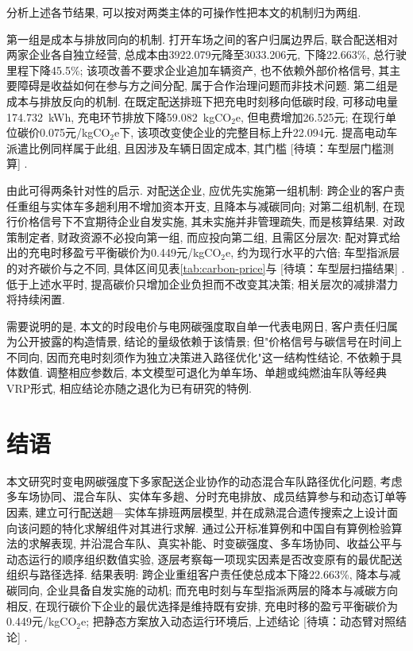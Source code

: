 \documentclass{setp-new}
\DeclareRobustCommand{\TBD}[1]{%
  \begingroup\setlength{\fboxsep}{1.2pt}%
  \colorbox{black!12}{\textcolor{black!65}{\textsf{\footnotesize[待填：#1]}}}%
  \endgroup}
\begin{document}
分析上述各节结果, 可以按对两类主体的可操作性把本文的机制归为两组.

第一组是成本与排放同向的机制. 打开车场之间的客户归属边界后, 联合配送相对两家企业各自独立经营,
总成本由3922.079元降至3033.206元, 下降22.663\%, 总行驶里程下降45.5\%;
该项改善不要求企业追加车辆资产, 也不依赖外部价格信号,
其主要障碍是收益如何在参与方之间分配, 属于合作治理问题而非技术问题.
第二组是成本与排放反向的机制. 在既定配送排班下把充电时刻移向低碳时段,
可移动电量174.732~kWh, 充电环节排放下降59.082~kgCO$_2$e, 但电费增加26.525元;
在现行单位碳价0.075元/kgCO$_2$e下, 该项改变使企业的完整目标上升22.094元.
提高电动车派遣比例同样属于此组, 且因涉及车辆日固定成本, 其门槛\TBD{车型层门槛测算}.

由此可得两条针对性的启示. 对配送企业, 应优先实施第一组机制:
跨企业的客户责任重组与实体车多趟利用不增加资本开支, 且降本与减碳同向;
对第二组机制, 在现行价格信号下不宜期待企业自发实施, 其未实施并非管理疏失, 而是核算结果.
对政策制定者, 财政资源不必投向第一组, 而应投向第二组, 且需区分层次:
配对算式给出的充电时移盈亏平衡碳价为0.449元/kgCO$_2$e, 约为现行水平的六倍;
车型指派层的对齐碳价与之不同, 具体区间见表\ref{tab:carbon-price}与\TBD{车型层扫描结果}.
低于上述水平时, 提高碳价只增加企业负担而不改变其决策; 相关层次的减排潜力将持续闲置.

需要说明的是, 本文的时段电价与电网碳强度取自单一代表电网日,
客户责任归属为公开披露的构造情景, 结论的量级依赖于该情景;
但"价格信号与碳信号在时间上不同向, 因而充电时刻须作为独立决策进入路径优化"这一结构性结论,
不依赖于具体数值. 调整相应参数后, 本文模型可退化为单车场、单趟或纯燃油车队等经典VRP形式,
相应结论亦随之退化为已有研究的特例.

\section{结语}

本文研究时变电网碳强度下多家配送企业协作的动态混合车队路径优化问题,
考虑多车场协同、混合车队、实体车多趟、分时充电排放、成员结算参与和动态订单等因素,
建立可行配送趟—实体车排班两层模型,
并在成熟混合遗传搜索之上设计面向该问题的特化求解组件对其进行求解.
通过公开标准算例和中国自有算例检验算法的求解表现,
并沿混合车队、真实补能、时变碳强度、多车场协同、收益公平与动态运行的顺序组织数值实验,
逐层考察每一项现实因素是否改变原有的最优配送组织与路径选择.
结果表明: 跨企业重组客户责任使总成本下降22.663\%, 降本与减碳同向, 企业具备自发实施的动机;
而充电时刻与车型指派两层的降本与减碳方向相反,
在现行碳价下企业的最优选择是维持既有安排, 充电时移的盈亏平衡碳价为0.449元/kgCO$_2$e;
把静态方案放入动态运行环境后, 上述结论\TBD{动态臂对照结论}.
\end{document}
